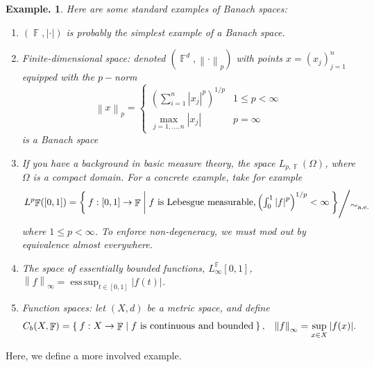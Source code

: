 \documentclass[11pt, a4paper]{memoir}
\DeclareMathOperator{\F}{{\mathbb{F}}}
\newcommand{\norm}[1]{\ensuremath{\left\lVert#1\right\rVert}}
\newcommand{\abs}[1]{\ensuremath{\left\lvert#1\right\rvert}}
\theoremstyle{change}
\theoremstyle{plain}
\theoremstyle{nonumberplain}
\newtheorem{example}{Example.}
\newcommand{\quot}[2]{\mathchoice{\left.\raisebox{0.14em}{$#1$}\middle/\raisebox{-0.14em}{$#2$}\right.}
                                 {\left.\raisebox{0.08em}{$#1$}\middle/\raisebox{-0.08em}{$#2$}\right.}
                                 {\left.\raisebox{0.03em}{$#1$}\middle/\raisebox{-0.03em}{$#2$}\right.}
                                 {\left.\raisebox{0em}{$#1$}\middle/\raisebox{0em}{$#2$}\right.}}
\DeclareMathOperator*{\esssup}{ess\,sup}
\numberwithin{equation}{section}
\begin{document}
\begin{example}
    Here are some standard examples of Banach spaces:
    \begin{enumerate}[r]
        \item $(\F,\abs{\cdot})$ is probably the simplest example of a Banach space.
        \item \textit{Finite-dimensional space:} denoted $(\F^d,\norm{\cdot}_p)$ with points $x=(x_j)_{j=1}^n$ equipped with the $p-$norm
            \begin{equation*}
                \norm{x}_p=\begin{cases}
                    \left(\sum_{i=1}^n\abs{x_j}^p\right)^{1/p} & 1\leq p<\infty\\
                    \max_{j=1,\ldots,n}|x_j| & p=\infty
                \end{cases}
            \end{equation*}
            is a Banach space
        \item If you have a background in basic measure theory, the space $L_{p,\F}(\Omega)$, where $\Omega$ is a compact domain.
            For a concrete example, take for example
            \begin{equation*}
                \quot{L^p{\F}([0,1])=\Set{f:[0,1]\to\F | f\text{ is Lebesgue measurable}, \left(\int_0^1\abs{f}^p\right)^{1/p}<\infty}}{\sim_{\text{a.e.}}}
            \end{equation*}
            where $1\leq p<\infty$.
            To enforce non-degeneracy, we must mod out by equivalence almost everywhere.
        \item The space of essentially bounded functions, $\displaystyle L_\infty^{\F}[0,1]$, $\norm{f}_\infty=\esssup_{t\in[0,1]}|f(t)|$.
        \item \textit{Function spaces:} let $(X,d)$ be a metric space, and define
            \begin{align*}
                C_b(X,\F)&=\Set{f:X\to\F | f\text{ is continuous and bounded}},&\norm{f}_\infty&=\sup_{x\in X}|f(x)|.
            \end{align*}
    \end{enumerate}
\end{example}
Here, we define a more involved example.
\end{document}
